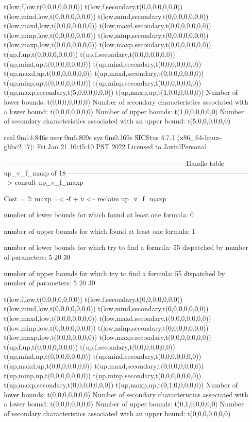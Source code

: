 t(low,f,low,t(0,0,0,0,0,0,0))
t(low,f,secondary,t(0,0,0,0,0,0,0))
t(low,mind,low,t(0,0,0,0,0,0,0))
t(low,mind,secondary,t(0,0,0,0,0,0,0))
t(low,maxd,low,t(0,0,0,0,0,0,0))
t(low,maxd,secondary,t(0,0,0,0,0,0,0))
t(low,minp,low,t(0,0,0,0,0,0,0))
t(low,minp,secondary,t(0,0,0,0,0,0,0))
t(low,maxp,low,t(0,0,0,0,0,0,0))
t(low,maxp,secondary,t(0,0,0,0,0,0,0))
t(up,f,up,t(0,0,0,0,0,0,0))
t(up,f,secondary,t(0,0,0,0,0,0,0))
t(up,mind,up,t(0,0,0,0,0,0,0))
t(up,mind,secondary,t(0,0,0,0,0,0,0))
t(up,maxd,up,t(0,0,0,0,0,0,0))
t(up,maxd,secondary,t(0,0,0,0,0,0,0))
t(up,minp,up,t(0,0,0,0,0,0,0))
t(up,minp,secondary,t(0,0,0,0,0,0,0))
t(up,maxp,secondary,t(5,0,0,0,0,0,0))
t(up,maxp,up,t(1,0,0,0,0,0,0))
Number of lower bounds:                                             t(0,0,0,0,0,0,0)
Number of secondary characteristics associated with a lower bound:  t(0,0,0,0,0,0,0)
Number of upper bounds:                                             t(1,0,0,0,0,0,0)
Number of secondary characteristics associated with an upper bound: t(5,0,0,0,0,0,0)

real	0m14.846s
user	0m6.809s
sys	0m0.169s
SICStus 4.7.1 (x86_64-linux-glibc2.17): Fri Jan 21 10:45:10 PST 2022
Licensed to JovialPersonal


--------------------------------------------------------------------------------
Handle table up_v_f_maxp of 18
--------------------------------------------------------------------------------
--> consult up_v_f_maxp

Cost =  2:  maxp =< -f + v
<-- reclaim up_v_f_maxp

number of lower bounds for which found at least one formula: 0

number of upper bounds for which found at least one formula: 1

number of lower bounds for which try to find a formula: 55
dispatched by number of parameters: 5  20  30

number of upper bounds for which try to find a formula: 55
dispatched by number of parameters: 5  20  30

t(low,f,low,t(0,0,0,0,0,0,0))
t(low,f,secondary,t(0,0,0,0,0,0,0))
t(low,mind,low,t(0,0,0,0,0,0,0))
t(low,mind,secondary,t(0,0,0,0,0,0,0))
t(low,maxd,low,t(0,0,0,0,0,0,0))
t(low,maxd,secondary,t(0,0,0,0,0,0,0))
t(low,minp,low,t(0,0,0,0,0,0,0))
t(low,minp,secondary,t(0,0,0,0,0,0,0))
t(low,maxp,low,t(0,0,0,0,0,0,0))
t(low,maxp,secondary,t(0,0,0,0,0,0,0))
t(up,f,up,t(0,0,0,0,0,0,0))
t(up,f,secondary,t(0,0,0,0,0,0,0))
t(up,mind,up,t(0,0,0,0,0,0,0))
t(up,mind,secondary,t(0,0,0,0,0,0,0))
t(up,maxd,up,t(0,0,0,0,0,0,0))
t(up,maxd,secondary,t(0,0,0,0,0,0,0))
t(up,minp,up,t(0,0,0,0,0,0,0))
t(up,minp,secondary,t(0,0,0,0,0,0,0))
t(up,maxp,secondary,t(0,0,0,0,0,0,0))
t(up,maxp,up,t(0,1,0,0,0,0,0))
Number of lower bounds:                                             t(0,0,0,0,0,0,0)
Number of secondary characteristics associated with a lower bound:  t(0,0,0,0,0,0,0)
Number of upper bounds:                                             t(0,1,0,0,0,0,0)
Number of secondary characteristics associated with an upper bound: t(0,0,0,0,0,0,0)

